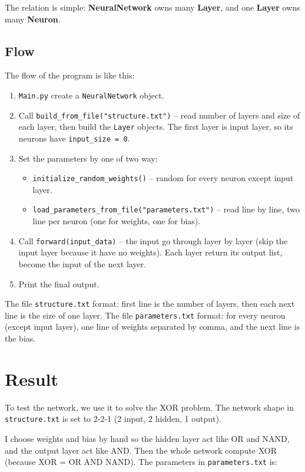 \documentclass[12pt,a4paper]{article}
\begin{document}
The relation is simple: \textbf{NeuralNetwork} owns many \textbf{Layer}, and one \textbf{Layer} owns many \textbf{Neuron}.

\subsection{Flow}

The flow of the program is like this:

\begin{enumerate}
    \item \texttt{Main.py} create a \texttt{NeuralNetwork} object.
    \item Call \texttt{build\_from\_file("structure.txt")} -- read number of layers and size of each layer, then build the \texttt{Layer} objects. The first layer is input layer, so its neurons have \texttt{input\_size = 0}.
    \item Set the parameters by one of two way:
    \begin{itemize}
        \item \texttt{initialize\_random\_weights()} -- random for every neuron except input layer.
        \item \texttt{load\_parameters\_from\_file("parameters.txt")} -- read line by line, two line per neuron (one for weights, one for bias).
    \end{itemize}
    \item Call \texttt{forward(input\_data)} -- the input go through layer by layer (skip the input layer because it have no weights). Each layer return its output list, become the input of the next layer.
    \item Print the final output.
\end{enumerate}

The file \texttt{structure.txt} format: first line is the number of layers, then each next line is the size of one layer. The file \texttt{parameters.txt} format: for every neuron (except input layer), one line of weights separated by comma, and the next line is the bias.

\section{Result}

To test the network, we use it to solve the XOR problem. The network shape in \texttt{structure.txt} is set to 2-2-1 (2 input, 2 hidden, 1 output).

I choose weights and bias by hand so the hidden layer act like OR and NAND, and the output layer act like AND. Then the whole network compute XOR (because XOR = OR AND NAND). The parameters in \texttt{parameters.txt} is:
\end{document}
